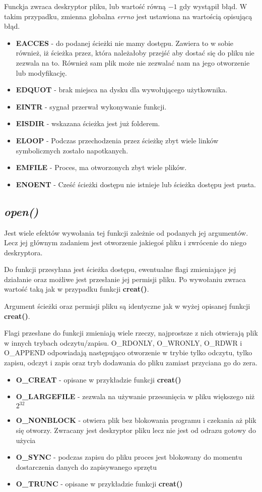 \documentclass{article}
\begin{document}
Funckja zwraca deskryptor pliku, lub wartość równą $-1$ gdy wystąpił błąd.
W takim przypadku, zmienna globalna \textit{errno} jest ustawiona na wartością opisującą błąd.
\begin{itemize}
\item \textbf{EACCES} - do podanej ścieżki nie mamy dostępu. Zawiera to w sobie również,
iż ścieżka przez, która należałoby przejść aby dostać się do pliku nie zezwala na to.
Również sam plik może nie zezwalać nam na jego otworzenie lub modyfikację.
\item \textbf{EDQUOT} - brak miejsca na dysku dla wywołującego użytkownika.
\item \textbf{EINTR} - sygnał przerwał wykonywanie funkcji.
\item \textbf{EISDIR} - wskazana ścieżka jest już folderem.
\item \textbf{ELOOP} - Podczas przechodzenia przez ścieżkę zbyt wiele linków symbolicznych zostało napotkanych.
\item \textbf{EMFILE} - Proces, ma otworzonych zbyt wiele plików.
\item \textbf{ENOENT} - Cześć ścieżki dostępu nie istnieje lub ścieżka dostępu jest pusta.
\end{itemize}

\subsection{\textit{open()}}
Jest wiele efektów wywołania tej funkcji zależnie od podanych jej argumentów.
Lecz jej głównym zadaniem jest otworzenie jakiegoś pliku i zwrócenie do niego deskryptora.

Do funkcji przesyłana jest ścieżka dostępu, ewentualne flagi zmieniające jej działanie oraz możliwe jest przesłanie jej permisji pliku.
Po wywołaniu zwraca wartość taką jak w przypadku funkcji \textbf{creat()}.

Argument ścieżki oraz permisji pliku są identyczne jak w wyżej opisanej funkcji \textbf{creat()}.

Flagi przesłane do funkcji zmieniają wiele rzeczy, najprostsze z nich otwierają plik w innych trybach odczytu/zapisu. O\_RDONLY, O\_WRONLY, O\_RDWR i O\_APPEND odpowiadają następująco otworzenie w trybie tylko odczytu, tylko zapisu, odczyt i zapis oraz tryb dodawania do pliku zamiast przyciana go do zera.

\begin{itemize}
\item \textbf{O\_CREAT} - opisane w przykładzie funkcji \textbf{creat()}
\item \textbf{O\_LARGEFILE} - zezwala na używanie przesunięcia w pliku większego niż $2^{32}$
\item \textbf{O\_NONBLOCK} - otwiera plik bez blokowania programu i czekania aż plik się otworzy. Zwracany jest deskryptor pliku lecz nie jest od odrazu gotowy do użycia
\item \textbf{O\_SYNC} - podczas zapisu do pliku proces jest blokowany do momentu dostarczenia danych do zapisywanego sprzętu
\item \textbf{O\_TRUNC} - opisane w przykładzie funkcji \textbf{creat()}
\end{itemize}
\end{document}
